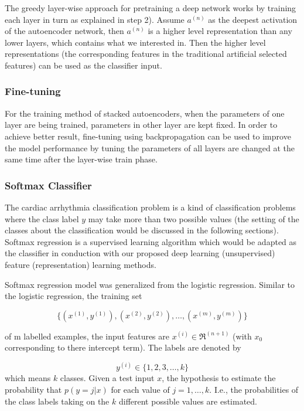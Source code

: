 \documentclass[journal]{IEEEtran}
\begin{document}
The greedy layer-wise approach for pretraining a deep network works by training each layer in turn as explained in step 2). Assume $a^{(n)}$ as the deepest activation of the autoencoder network, then $a^{(n)}$ is a higher level representation than any lower layers, which contains what we interested in. Then the higher level representations (the corresponding features in the traditional artificial selected features) can be used as the classifier input.

\subsubsection{Fine-tuning}
For the training method of stacked autoencoders, when the parameters of one layer are being trained, parameters in other layer are kept fixed. In order to achieve better result, fine-tuning using backpropagation can be used to improve the model performance by tuning the parameters of all layers are changed at the same time after the layer-wise train phase.

\subsubsection{Softmax Classifier}
The cardiac arrhythmia classification problem is a kind of classification problems where the class label $y$ may take more than two possible values (the setting of the classes about the classification would be discussed in the following sections). Softmax regression is a supervised learning algorithm which would be adapted as the classifier in conduction with our proposed deep learning (unsupervised) feature (representation) learning methods. 

Softmax regression model was generalized  from the logistic regression. Similar to the logistic regression, the training set

\begin{equation}
\{(x^{(1)},y^{(1)}), (x^{(2)},y^{(2)}), \ldots, (x^{(m)},y^{(m)}) \}
\end{equation}

\noindent of m labelled examples, the input features are $x^{(i)} \in \Re^{(n+1)}$ (with $x_0$ corresponding to there intercept term). The labels are denoted by 

\begin{equation}
y^{(i)} \in \{1,2,3,\ldots,k\}
\end{equation}
\noindent which means $k$ classes.
Given a test input $x$, the hypothesis to estimate the probability that $p(y=j|x)$ for each value of $j=1,\ldots,k$. I.e., the probabilities of the class labels taking on the $k$ different possible values are estimated. 
\end{document}
